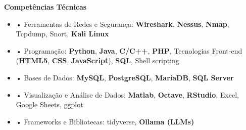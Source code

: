 \documentclass[10pt,a4paper,oneside]{article}
\newlength{\datewidth}
\newlength{\textindent}
\begin{document}
	\textbf{\hspace{\textindent}Competências Técnicas}
	\begin{itemize}
		\item[\hspace{\datewidth}] \parbox[t]{\dimexpr\linewidth-\datewidth-\textindent}{• Ferramentas de Redes e Segurança: \textbf{Wireshark}, \textbf{Nessus}, \textbf{Nmap}, Tcpdump, Snort, \textbf{Kali Linux}}
		\item[\hspace{\datewidth}] \parbox[t]{\dimexpr\linewidth-\datewidth-\textindent}{• Programação: \textbf{Python}, \textbf{Java}, \textbf{C/C++}, \textbf{PHP}, Tecnologias Front-end (\textbf{HTML5}, \textbf{CSS}, \textbf{JavaScript}), \textbf{SQL}, Shell scripting}
		\item[\hspace{\datewidth}] \parbox[t]{\dimexpr\linewidth-\datewidth-\textindent}{• Bases de Dados: \textbf{MySQL}, \textbf{PostgreSQL}, \textbf{MariaDB}, \textbf{SQL Server}}
		\item[\hspace{\datewidth}] \parbox[t]{\dimexpr\linewidth-\datewidth-\textindent}{• Visualização e Análise de Dados: \textbf{Matlab}, \textbf{Octave}, \textbf{RStudio}, Excel, Google Sheets, ggplot}
		
		\item[\hspace{\datewidth}] \parbox[t]{\dimexpr\linewidth-\datewidth-\textindent}{• Frameworks e Bibliotecas: tidyverse, \textbf{Ollama (LLMs)}}    
		

\end{itemize}
\end{document}
